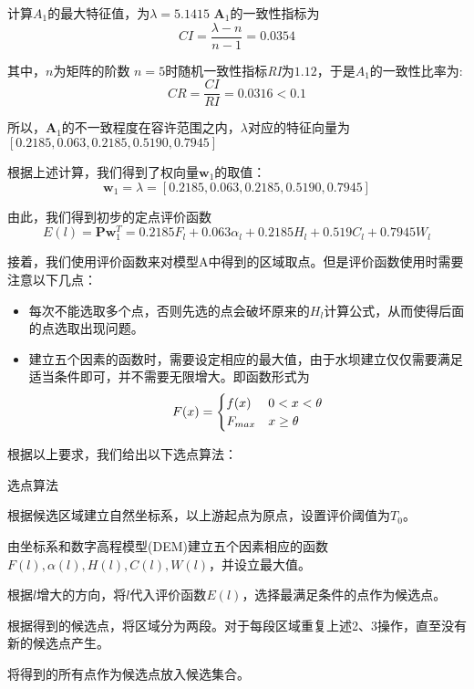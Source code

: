 \documentclass[nocover]{cumcmart}
\begin{document}
计算$A_{1}$的最大特征值，为$\lambda = 5.1415$
$\textbf{A}_1$的一致性指标为
\[\mathit{CI} = \frac{\lambda - n}{n - 1} = 0.0354\]

其中，$n$为矩阵的阶数
$n = 5$时随机一致性指标\textit{RI}为$1.12$，于是$A_{1}$的一致性比率为:
\[\mathit{CR} = \frac{\mathit{CI}}{\mathit{RI}} = 0.0316 < 0.1 \]

所以，$\textbf{A}_1$的不一致程度在容许范围之内，$\lambda$对应的特征向量为$\left[0.2185, 0.063, 0.2185, 0.5190, 0.7945\right]$

根据上述计算，我们得到了权向量$\textbf{w}_{1}$的取值：
\begin{equation}
\textbf{w}_{1} = \lambda = \left[0.2185, 0.063, 0.2185, 0.5190, 0.7945\right]
\end{equation}

由此，我们得到初步的定点评价函数
\begin{equation}
E(l) = \textbf{P}\textbf{w}_{1}^{T} = 0.2185F_l + 0.063{\alpha}_{l} + 0.2185H_l + 0.519C_l + 0.7945W_l
\end{equation}

接着，我们使用评价函数来对模型A中得到的区域取点。但是评价函数使用时需要注意以下几点：
\begin{itemize}
\item 每次不能选取多个点，否则先选的点会破坏原来的$H_l$计算公式，从而使得后面的点选取出现问题。
\item 建立五个因素的函数时，需要设定相应的最大值，由于水坝建立仅仅需要满足适当条件即可，并不需要无限增大。即函数形式为
\begin{eqnarray}
F(x) =
\begin{cases}
f(x) & 0 < x < \theta \cr F_{max} & x \ge \theta
\end{cases}
\end{eqnarray}
\end{itemize}


根据以上要求，我们给出以下选点算法：
\begin{framed}
\begin{list}{.}
    {\setlength{\parsep}{0ex}\setlength{\itemsep}{0ex}}
\item[] 选点算法
\item 根据候选区域建立自然坐标系，以上游起点为原点，设置评价阈值为$T_{0}$。
\item 由坐标系和数字高程模型(DEM)建立五个因素相应的函数$F(l),\alpha(l),H(l),C(l),W(l)$，并设立最大值。
\item 根据$l$增大的方向，将$l$代入评价函数$E(l)$，选择最满足条件的点作为候选点。
\item 根据得到的候选点，将区域分为两段。对于每段区域重复上述2、3操作，直至没有新的候选点产生。
\item 将得到的所有点作为候选点放入候选集合。
\end{list}
\end{framed}
\end{document}
